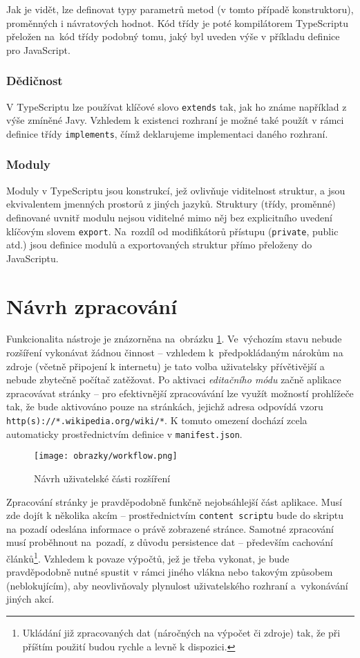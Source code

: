 Jak je vidět, lze definovat typy parametrů metod (v tomto případě konstruktoru), proměnných i návratových hodnot. Kód třídy je poté kompilátorem TypeScriptu přeložen na~kód třídy podobný tomu, jaký byl uveden výše v příkladu definice pro JavaScript.

\subsubsection{Dědičnost}
V TypeScriptu lze používat klíčové slovo \texttt{extends} tak, jak ho známe například z výše zmíněné Javy. Vzhledem k existenci rozhraní je možné také použít v rámci definice třídy \texttt{implements}, čímž deklarujeme implementaci daného rozhraní.

\subsubsection{Moduly}
Moduly v TypeScriptu jsou konstrukcí, jež ovlivňuje viditelnost struktur, a jsou ekvivalentem jmenných prostorů z jiných jazyků. Struktury (třídy, proměnné) definované uvnitř modulu nejsou viditelné mimo něj bez explicitního uvedení klíčovým slovem \texttt{export}. Na~rozdíl od modifikátorů přístupu (\texttt{private}, {public} atd.) jsou definice modulů a exportovaných struktur přímo přeloženy do JavaScriptu.

\section{Návrh zpracování}
Funkcionalita nástroje je znázorněna na~obrázku \ref{obrWorkflow}. Ve~výchozím stavu nebude rozšíření vykonávat žádnou činnost -- vzhledem k~předpokládaným nárokům na zdroje (včetně připojení k internetu) je tato volba uživatelsky přívětivější a nebude zbytečně počítač zatěžovat. Po aktivaci \textit{editačního módu} začně aplikace zpracovávat stránky -- pro efektivnější zpracovávání lze využít možností  prohlížeče tak, že bude aktivováno pouze na stránkách, jejichž adresa odpovídá vzoru \texttt{http(s)://*.wikipedia.org/wiki/*}. K tomuto omezení dochází zcela automaticky prostřednictvím definice v \texttt{manifest.json}. 

\begin{figure}[h!]
	\centering
	\texttt{[image: obrazky/workflow.png]}
	\caption{Návrh  uživatelské části rozšíření}
	\label{obrWorkflow}
\end{figure}

Zpracování stránky je pravděpodobně funkčně nejobsáhlejší část aplikace. Musí zde dojít k několika akcím -- prostřednictvím \texttt{content scriptu} bude do skriptu na pozadí odeslána informace o právě zobrazené stránce. Samotné zpracování musí proběhnout na~pozadí, z důvodu persistence dat -- především cachování článků\footnote{Ukládání již zpracovaných dat (náročných na výpočet či zdroje) tak, že při příštím použití budou rychle a levně k dispozici.}. Vzhledem k povaze výpočtů, jež je třeba vykonat, je bude pravděpodobně nutné spustit v rámci jiného vlákna nebo takovým způsobem (neblokujícím), aby neovlivňovaly plynulost uživatelského rozhraní a~vykonávání jiných akcí.

